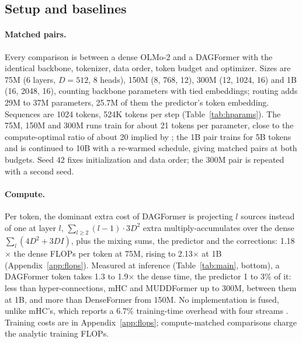 \documentclass[11pt]{article}
\newcommand{\dagf}{DAGFormer}
\begin{document}
\subsection{Setup and baselines}
\label{sec:setup}

\paragraph{Matched pairs.} Every comparison is between a dense OLMo-2 and a \dagf{} with the identical backbone, tokenizer, data order, token budget and optimizer. Sizes are 75M (6 layers, $D{=}512$, 8 heads), 150M (8, 768, 12), 300M (12, 1024, 16) and 1B (16, 2048, 16), counting backbone parameters with tied embeddings; routing adds 29M to 37M parameters, 25.7M of them the predictor's token embedding. Sequences are 1024 tokens, 524K tokens per step (Table~\ref{tab:hparams}). The 75M, 150M and 300M runs train for about 21 tokens per parameter, close to the compute-optimal ratio of about 20 implied by \citet{hoffmann2022chinchilla}; the 1B pair trains for 5B tokens and is continued to 10B with a re-warmed schedule, giving matched pairs at both budgets. Seed 42 fixes initialization and data order; the 300M pair is repeated with a second seed.

\paragraph{Compute.} Per token, the dominant extra cost of \dagf{} is projecting $l$ sources instead of one at layer $l$, $\sum_{l\ge2} (l{-}1)\cdot 3D^2$ extra multiply-accumulates over the dense $\sum_l (4D^2 + 3DI)$, plus the mixing sums, the predictor and the corrections: 1.18$\times$ the dense FLOPs per token at 75M, rising to 2.13$\times$ at 1B (Appendix~\ref{app:flops}). Measured at inference (Table~\ref{tab:main}, bottom), a \dagf{} token takes 1.3 to 1.9$\times$ the dense time, the predictor 1 to 3\% of it: less than hyper-connections, mHC and MUDDFormer up to 300M, between them at 1B, and more than DenseFormer from 150M. No implementation is fused, unlike mHC's, which reports a 6.7\% training-time overhead with four streams \citep{mhc2026}. Training costs are in Appendix~\ref{app:flops}; compute-matched comparisons charge the analytic training FLOPs.
\end{document}
